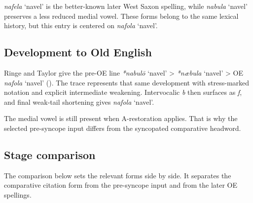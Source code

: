 \documentclass[
  british,
  a4paper,
  openany]{book}
\providecommand{\Recon}[1]{\emph{*#1}}
{\catcode`→=\active \global\def→{\ensuremath{\rightarrow}}}
\providecommand{\Recon}[1]{\emph{*#1}}
{\catcode`→=\active \global\def→{\ensuremath{\rightarrow}}}
\begin{document}
{\emph{nafela}} `navel' is the better-known later West Saxon spelling,
while {\emph{nabula}} `navel' preserves a less reduced medial vowel.
These forms belong to the same lexical history, but this entry is
centered on {\emph{nafola}} `navel'.

\subsection{Development to Old
English}\label{development-to-old-english-89}

Ringe and Taylor give the pre-OE line \Recon{nabulō} `navel'
\textgreater{} \Recon{næbula} `navel' \textgreater{} OE \emph{nafola}
`navel' ().
The trace represents that same development with stress-marked notation
and explicit intermediate weakening. Intervocalic \emph{b} then surfaces
as \emph{f}, and final weak-tail shortening gives \emph{nafola} `navel'.

The medial vowel is still present when A-restoration applies. That is
why the selected pre-syncope input differs from the syncopated
comparative headword.

\subsection{Stage comparison}\label{stage-comparison}

The comparison below sets the relevant forms side by side. It separates
the comparative citation form from the pre-syncope input and from the
later OE spellings.
\end{document}
